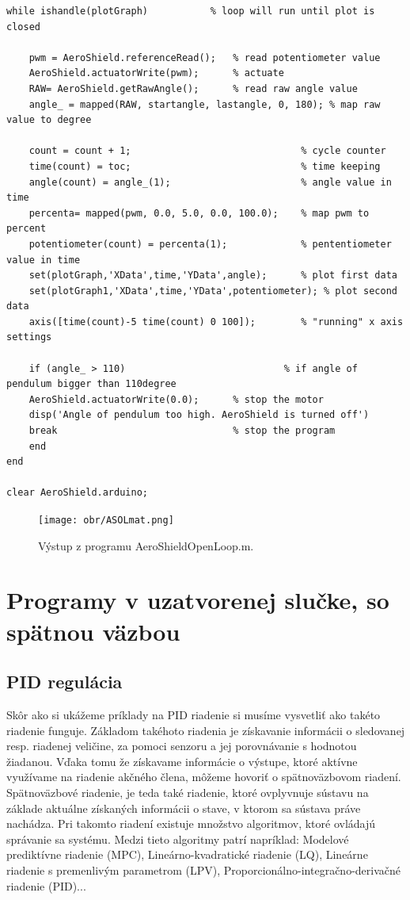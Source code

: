 \begin{lstlisting}[caption={AeroShield open loop, while cyklus.},captionpos=b]
while ishandle(plotGraph)           % loop will run until plot is closed
	
	pwm = AeroShield.referenceRead();   % read potentiometer value
	AeroShield.actuatorWrite(pwm);      % actuate 
	RAW= AeroShield.getRawAngle();      % read raw angle value
	angle_ = mapped(RAW, startangle, lastangle, 0, 180); % map raw value to degree 
	
	count = count + 1;                              % cycle counter
	time(count) = toc;                              % time keeping
	angle(count) = angle_(1);                       % angle value in time
	percenta= mapped(pwm, 0.0, 5.0, 0.0, 100.0);    % map pwm to percent 
	potentiometer(count) = percenta(1);             % pententiometer value in time
	set(plotGraph,'XData',time,'YData',angle);      % plot first data 
	set(plotGraph1,'XData',time,'YData',potentiometer); % plot second data 
	axis([time(count)-5 time(count) 0 100]);        % "running" x axis settings
	
	if (angle_ > 110)                            % if angle of pendulum bigger than 110degree
	AeroShield.actuatorWrite(0.0);      % stop the motor 
	disp('Angle of pendulum too high. AeroShield is turned off')
	break                               % stop the program
	end
end  

clear AeroShield.arduino;           
\end{lstlisting}

\begin{figure}[!tbh]
	\centering
	\texttt{[image: obr/ASOLmat.png]}
	\caption{Výstup z programu AeroShieldOpenLoop.m.}\label{OBRAZOK 3.2}
\end{figure}

\newpage
\section{Programy v uzatvorenej slučke, so spätnou väzbou}
\subsection{PID regulácia}

Skôr ako si ukážeme príklady na PID riadenie si musíme vysvetliť ako takéto riadenie funguje. Základom takéhoto riadenia je získavanie informácii o sledovanej resp. riadenej veličine, za pomoci senzoru a jej porovnávanie s hodnotou žiadanou. Vďaka tomu že získavame informácie o výstupe, ktoré aktívne využívame na riadenie akčného člena, môžeme hovoriť o spätnoväzbovom riadení. Spätnoväzbové riadenie, je teda také riadenie, ktoré ovplyvnuje sústavu na základe aktuálne získaných informácii o stave, v ktorom sa sústava práve nachádza. Pri takomto riadení existuje množstvo algoritmov, ktoré ovládajú správanie sa systému. Medzi tieto algoritmy patrí napríklad: Modelové prediktívne riadenie (MPC), Lineárno-kvadratické riadenie (LQ), Lineárne riadenie s premenlivým parametrom (LPV), Proporcionálno-integračno-derivačné riadenie (PID)...

